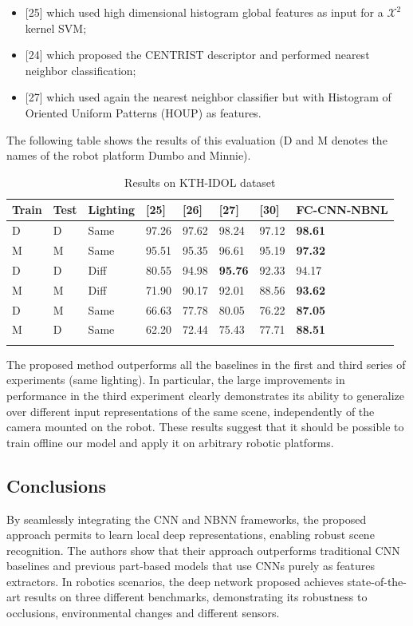 \begin{itemize}
\item
  {[}25{]} which used high dimensional histogram global features as
  input for a ${\mathcal X}^{2}$ kernel SVM; 
\item
  {[}24{]} which proposed the CENTRIST descriptor and performed nearest
  neighbor classification;
\item
  {[}27{]} which used again the nearest neighbor classifier but with
  Histogram of Oriented Uniform Patterns (HOUP) as features.
\end{itemize}

The following table shows the results of this evaluation (D and M
denotes the names of the robot platform Dumbo and Minnie).

\begin{longtable}[]{@{}llllllll@{}}
\toprule
\textbf{Train} & \textbf{Test} & \textbf{Lighting} & \textbf{{[}25{]}} &
\textbf{{[}26{]}} & \textbf{{[}27{]}} & \textbf{{[}30{]}} &
\textbf{FC-CNN-NBNL}\tabularnewline
\midrule
\endhead
D & D & Same & 97.26 & 97.62 & 98.24 & 97.12 &
\textbf{98.61}\tabularnewline
M & M & Same & 95.51 & 95.35 & 96.61 & 95.19 &
\textbf{97.32}\tabularnewline
D & D & Diff & 80.55 & 94.98 & \textbf{95.76} & 92.33 &
94.17\tabularnewline
M & M & Diff & 71.90 & 90.17 & 92.01 & 88.56 &
\textbf{93.62}\tabularnewline
D & M & Same & 66.63 & 77.78 & 80.05 & 76.22 &
\textbf{87.05}\tabularnewline
M & D & Same & 62.20 & 72.44 & 75.43 & 77.71 &
\textbf{88.51}\tabularnewline
\bottomrule
\caption{Results on KTH-IDOL dataset}
\end{longtable}

The proposed method outperforms all the baselines in the first and third
series of experiments (same lighting). In particular, the large
improvements in performance in the third experiment clearly demonstrates
its ability to generalize over different input representations of the
same scene, independently of the camera mounted on the robot. These
results suggest that it should be possible to train offline our model
and apply it on arbitrary robotic platforms.

\subsection{Conclusions}\label{header-n861}

By seamlessly integrating the CNN and NBNN frameworks, the proposed
approach permits to learn local deep representations, enabling robust
scene recognition. The authors show that their approach outperforms
traditional CNN baselines and previous part-based models that use CNNs
purely as features extractors. In robotics scenarios, the deep network
proposed achieves state-of-the-art results on three different
benchmarks, demonstrating its robustness to occlusions, environmental
changes and different sensors.